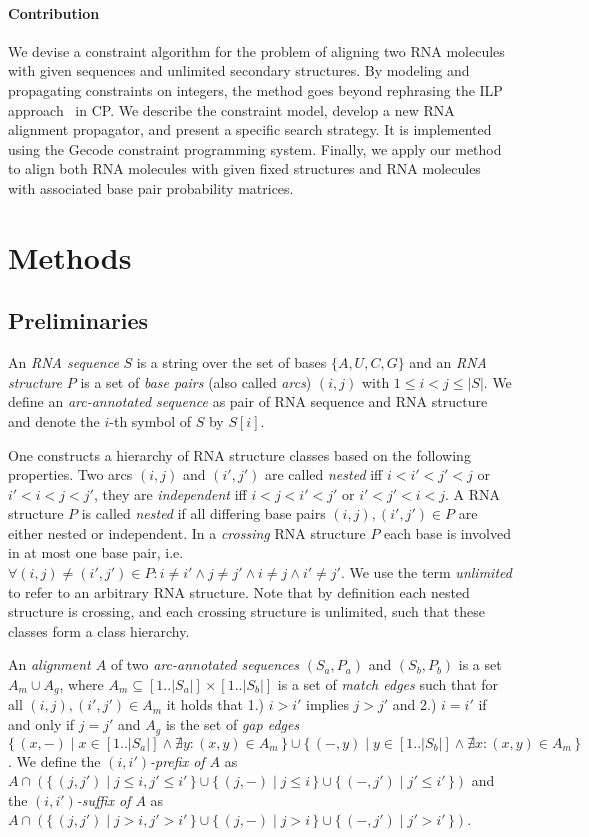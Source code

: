 \documentclass{easychair}
\newcommand*{\PSET}[2]{\{\,#1\mid#2\,\}}
\begin{document}
\paragraph{Contribution} We devise a constraint algorithm for the
problem of aligning two RNA molecules with given sequences and
unlimited secondary structures. By modeling and propagating
constraints on integers, the method goes beyond rephrasing the ILP
approach~\cite{Bauer:Klau:Reinert:Accur_multi_seque:2007} in CP. We
describe the constraint model, develop a new RNA alignment propagator,
and present a specific search strategy. It is implemented using the
Gecode constraint programming system. Finally, we apply our method to
align both RNA molecules with given fixed structures and RNA molecules
with associated base pair probability matrices.

\section{Methods}

\subsection{Preliminaries}
An \emph{RNA sequence} $S$ is a string over the set of bases
$\{A,U,C,G\}$ and an \emph{RNA structure} $P$ is a set of \emph{base
  pairs} (also called \emph{arcs}) $(i,j)$ with $1 \leq i< j \leq
|S|$. We define an \emph{arc-annotated sequence} as pair of RNA sequence
and RNA structure and denote the $i$-th symbol of $S$ by $S[i]$.

One constructs a hierarchy of RNA structure classes based on the
following properties. Two arcs $(i,j)$ and $(i',j')$ are called
\emph{nested} iff $i<i'<j'<j$ or $i'<i<j<j'$, they are
\emph{independent} iff $i<j<i'<j'$ or $i'<j'<i<j$.
%
A RNA structure $P$ is called \emph{nested} if all differing base
pairs $(i,j),(i',j')\in P$ are either nested or independent.  In a
\emph{crossing} RNA structure $P$ each base is involved in at most one base
pair, i.e. $\forall (i,j)\neq(i',j')\in P: i\neq i' \land j\neq j'
\land i\neq j \land i'\neq j'$. We use the term \emph{unlimited} to
refer to an arbitrary RNA structure. Note that by definition each
nested structure is crossing, and each crossing structure is
unlimited, such that these classes form a class hierarchy.

An \emph{alignment $A$} of two \emph{arc-annotated sequences}
$(S_a,P_a)$ and $(S_b,P_b)$ is a set $A_m\cup A_g$, where
$A_m\subseteq [1..|S_a|] \times [1..|S_b|]$ is a set of \emph{match
  edges} such that for all $(i,j),(i',j')\in A_m$ it holds that 1.)
$i>i'$ implies $j>j'$ and 2.)  $i=i'$ if and only if $j=j'$ and $A_g$
is the set of \emph{gap edges} $\PSET{(x,-)}{x\in [1..|S_a|]\land
  \nexists y: (x,y)\in A_m}\cup\PSET{(-,y)}{y\in [1..|S_b|]\land
  \nexists x: (x,y)\in A_m}$.
%
We define the \emph{$(i,i')$-prefix of $A$} as
$A\cap(\PSET{(j,j')}{j\leq i,j'\leq i'}\cup\PSET{(j,-)}{j\leq i}\cup\PSET{(-,j')}{j'\leq i'})$
and the  \emph{$(i,i')$-suffix of $A$} as
$A\cap(\PSET{(j,j')}{j>i,j'>i'}\cup\PSET{(j,-)}{j>i}\cup\PSET{(-,j')}{j'>i'})$.
\end{document}
